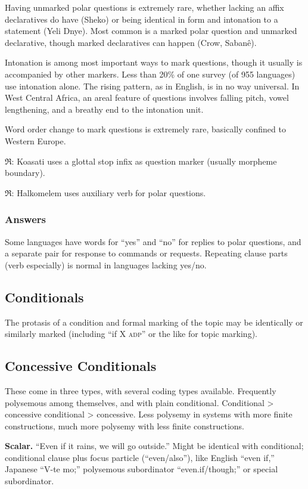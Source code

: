 \documentclass[11pt]{article}
\newcommand{\I}[1]{\textsc{#1}}   %
\newcommand{\rara}[1]{$\mathfrak{R}$: #1}
\begin{document}
{Having unmarked polar questions is extremely rare, whether lacking an
affix declaratives do have (Sheko) or being identical in form and
intonation to a statement (Yeli Dnye).  Most common is a marked polar
question and unmarked declarative, though marked declaratives can
happen (Crow, Sabanê).

Intonation is among most important ways to mark questions, though it
usually is accompanied by other markers.  Less than 20\% of one survey
(of 955 languages) use intonation alone.  The rising pattern, as in
English, is in no way universal.  In West Central Africa, an areal
feature of questions involves falling pitch, vowel lengthening, and a
breathy end to the intonation unit.

Word order change to mark questions is extremely rare, basically
confined to Western Europe.

\rara{Koasati uses a glottal stop infix as question marker (usually
morpheme boundary).}

\rara{Halkomelem uses auxiliary verb for polar questions.}

\subsubsection{Answers}
Some languages have words for ``yes'' and ``no'' for replies to polar
questions, and a separate pair for response to commands or requests.
Repeating clause parts (verb especially) is normal in languages
lacking yes/no.



\subsection{Conditionals}
The protasis of a condition and formal marking of the topic may be
identically or similarly marked (including ``if X \I{adp}'' or the
like for topic marking).

\subsection{Concessive Conditionals}
These come in three types, with several coding types available.
Frequently polysemous among themselves, and with plain conditional.
Conditional > concessive conditional > concessive.  Less polysemy in
systems with more finite constructions, much more polysemy with less
finite constructions.

\textbf{Scalar.} ``Even if it rains, we will go outside.''  Might be
identical with conditional; conditional clause plus focus particle
(``even/also''), like English ``even if,'' Japanese ``V-te mo;''
polysemous subordinator ``even.if/though;'' or special subordinator.

}
\end{document}
